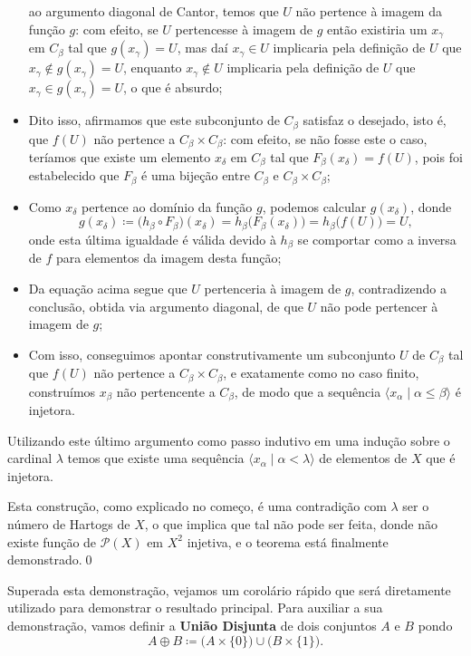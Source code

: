 \documentclass{hipatia}
\newcommand{\partes}[1]{\mathcal{P}(#1)}
\begin{document}
\begin{itemize}[leftmargin=*]
ao argumento diagonal de Cantor, temos que $U$ não
pertence à imagem da função $g$: com efeito, se
$U$ pertencesse à imagem de $g$ então existiria um
$x_\gamma$ em $C_\beta$ tal que $g(x_\gamma)=U$,
mas daí $x_\gamma\in U$ implicaria pela definição de
$U$ que $x_\gamma\notin g(x_\gamma)=U$, enquanto
$x_\gamma\notin U$ implicaria pela definição de $U$
que $x_\gamma\in g(x_\gamma)=U$, o que é absurdo;
\item Dito isso, afirmamos que este subconjunto de
$C_\beta$ satisfaz o desejado, isto é, que $f(U)$
não pertence a $C_\beta\times C_\beta$: com
efeito, se não fosse este o caso, teríamos que
existe um elemento $x_\delta$ em $C_\beta$ tal que
$F_\beta(x_\delta)=f(U)$, pois foi estabelecido
que $F_\beta$ é uma bijeção entre $C_\beta$ e
$C_\beta\times C_\beta$; \item Como $x_\delta$
pertence ao domínio da função $g$, podemos
calcular $g(x_\delta)$, donde
$$g(x_\delta)\coloneq\big(h_\beta\circ
F_\beta\big)(x_\delta)=h_\beta\big(F_\beta(x_\delta)\big)=h_\beta\big(f(U)\big)=U,$$
onde esta última igualdade é válida devido à
$h_\beta$ se comportar como a inversa de $f$
para elementos da imagem desta função; \item Da equação acima segue que $U$ pertenceria à imagem de $g$, contradizendo a conclusão, obtida via argumento diagonal, de que $U$ não pode pertencer à imagem de $g$;
\item Com isso, conseguimos apontar construtivamente
um subconjunto $U$ de $C_\beta$ tal que $f(U)$ não
pertence a $C_\beta\times C_\beta$, e exatamente
como no caso finito, construímos $x_\beta$ não
pertencente a $C_\beta$, de modo que a sequência
$\langle x_\alpha\mid\alpha\leq\beta\rangle$ é
injetora. \end{itemize}



Utilizando este último argumento como passo
indutivo em uma indução sobre o cardinal $\lambda$
temos que existe uma sequência $\langle
x_\alpha\mid\alpha<\lambda\rangle$ de elementos de
$X$ que é injetora.

Esta construção, como explicado no começo, é uma
contradição com $\lambda$ ser o número de Hartogs
de $X$, o que implica que tal não pode ser feita,
donde não existe função de $\partes{X}$ em $X^2$
injetiva, e o teorema está finalmente
demonstrado.\qed

Superada esta demonstração, vejamos um corolário
rápido que será diretamente utilizado para
demonstrar o resultado principal. Para auxiliar a
sua demonstração, vamos definir a {\bf União
Disjunta} de dois conjuntos $A$ e $B$ pondo
$$A\oplus
B\coloneq\big(A\times\{0\}\big)\cup\big(B\times\{1\}\big).$$
\end{document}
